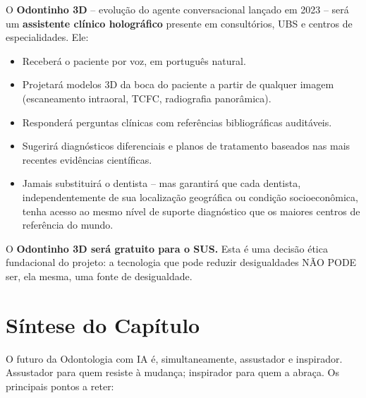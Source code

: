 O \textbf{Odontinho 3D} -- evolução do agente conversacional lançado em 2023 --
será um \textbf{assistente clínico holográfico} presente em consultórios, UBS e
centros de especialidades. Ele:
\begin{itemize}
  \item Receberá o paciente por voz, em português natural.
  \item Projetará modelos 3D da boca do paciente a partir de qualquer imagem
    (escaneamento intraoral, TCFC, radiografia panorâmica).
  \item Responderá perguntas clínicas com referências bibliográficas auditáveis.
  \item Sugerirá diagnósticos diferenciais e planos de tratamento baseados nas
    mais recentes evidências científicas.
  \item Jamais substituirá o dentista -- mas garantirá que cada dentista,
    independentemente de sua localização geográfica ou condição socioeconômica,
    tenha acesso ao mesmo nível de suporte diagnóstico que os maiores centros
    de referência do mundo.
\end{itemize}

O \textbf{Odontinho 3D será gratuito para o SUS.} Esta é uma decisão ética
fundacional do projeto: a tecnologia que pode reduzir desigualdades NÃO PODE
ser, ela mesma, uma fonte de desigualdade.


\section{Síntese do Capítulo}

O futuro da Odontologia com IA é, simultaneamente, assustador e inspirador.
Assustador para quem resiste à mudança; inspirador para quem a abraça. Os
principais pontos a reter:

